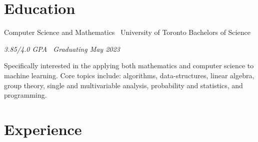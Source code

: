 \documentclass[]{style}
\begin{document}
\section{Education}

\begin{entrylist}


\entry
{Computer Science and Mathematics \ {\normalfont University of Toronto}}
{Bachelors of Science}
{\emph{3.85/4.0 GPA \ Graduating May 2023}
~ \vspace{1mm}

Specifically interested in the applying both mathematics and computer science to machine learning. Core topics include: algorithms, data-structures, linear algebra, group theory, single and multivariable analysis, probability and statistics, and programming.}


\end{entrylist}


\section{Experience}
\end{document}
